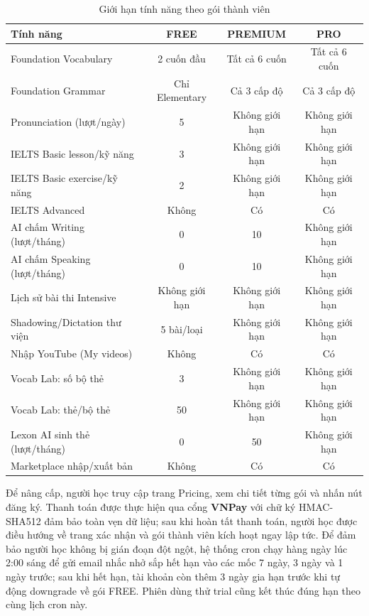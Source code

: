 \begin{table}[H]
\centering
\caption{Giới hạn tính năng theo gói thành viên}
\label{tab:feature-limits}
\begin{tabular}{|l|c|c|c|}
\hline
\textbf{Tính năng} & \textbf{FREE} & \textbf{PREMIUM} & \textbf{PRO} \\
\hline
Foundation Vocabulary & 2 cuốn đầu & Tất cả 6 cuốn & Tất cả 6 cuốn \\
Foundation Grammar & Chỉ Elementary & Cả 3 cấp độ & Cả 3 cấp độ \\
Pronunciation (lượt/ngày) & 5 & Không giới hạn & Không giới hạn \\
IELTS Basic lesson/kỹ năng & 3 & Không giới hạn & Không giới hạn \\
IELTS Basic exercise/kỹ năng & 2 & Không giới hạn & Không giới hạn \\
IELTS Advanced & Không & Có & Có \\
AI chấm Writing (lượt/tháng) & 0 & 10 & Không giới hạn \\
AI chấm Speaking (lượt/tháng) & 0 & 10 & Không giới hạn \\
Lịch sử bài thi Intensive & Không giới hạn & Không giới hạn & Không giới hạn \\
Shadowing/Dictation thư viện & 5 bài/loại & Không giới hạn & Không giới hạn \\
Nhập YouTube (My videos) & Không & Có & Có \\
Vocab Lab: số bộ thẻ & 3 & Không giới hạn & Không giới hạn \\
Vocab Lab: thẻ/bộ thẻ & 50 & Không giới hạn & Không giới hạn \\
Lexon AI sinh thẻ (lượt/tháng) & 0 & 50 & Không giới hạn \\
Marketplace nhập/xuất bản & Không & Có & Có \\
\hline
\end{tabular}
\end{table}

Để nâng cấp, người học truy cập trang Pricing, xem chi tiết từng gói và nhấn nút đăng ký. Thanh toán được thực hiện qua cổng \textbf{VNPay} với chữ ký HMAC-SHA512 đảm bảo toàn vẹn dữ liệu; sau khi hoàn tất thanh toán, người học được điều hướng về trang xác nhận và gói thành viên kích hoạt ngay lập tức. Để đảm bảo người học không bị gián đoạn đột ngột, hệ thống cron chạy hàng ngày lúc 2:00 sáng để gửi email nhắc nhở sắp hết hạn vào các mốc 7 ngày, 3 ngày và 1 ngày trước; sau khi hết hạn, tài khoản còn thêm 3 ngày gia hạn trước khi tự động downgrade về gói FREE. Phiên dùng thử trial cũng kết thúc đúng hạn theo cùng lịch cron này.

